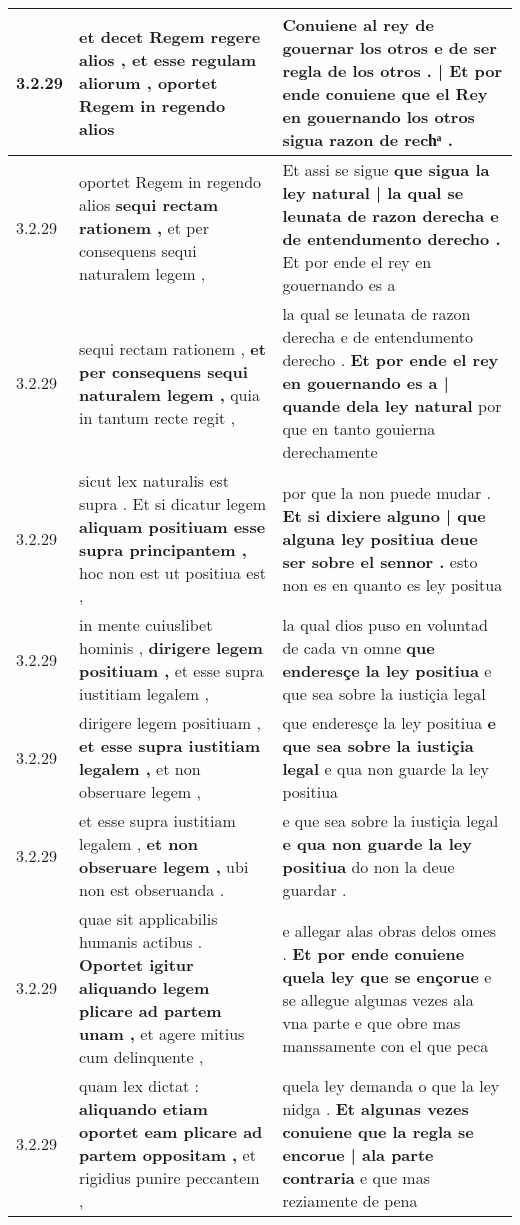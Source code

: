 \begin{tabular}{|p{1cm}|p{6.5cm}|p{6.5cm}|}
3.2.29 & et decet Regem regere alios , \textbf{ et esse regulam aliorum , } oportet Regem in regendo alios & Conuiene al rey de gouernar los otros \textbf{ e de ser regla de los otros . | Et por ende conuiene } que el Rey en gouernando los otros sigua razon de rechͣ . \\\hline
3.2.29 & oportet Regem in regendo alios \textbf{ sequi rectam rationem , } et per consequens sequi naturalem legem , & Et assi se sigue \textbf{ que sigua la ley natural | la qual se leunata de razon derecha e de entendumento derecho . } Et por ende el rey en gouernando es a \\\hline
3.2.29 & sequi rectam rationem , \textbf{ et per consequens sequi naturalem legem , } quia in tantum recte regit , & la qual se leunata de razon derecha e de entendumento derecho . \textbf{ Et por ende el rey en gouernando es a | quande dela ley natural } por que en tanto gouierna derechamente \\\hline
3.2.29 & sicut lex naturalis est supra . Et si dicatur legem \textbf{ aliquam positiuam esse supra principantem , } hoc non est ut positiua est , & por que la non puede mudar . \textbf{ Et si dixiere alguno | que alguna ley positiua deue ser sobre el sennor . } esto non es en quanto es ley positua \\\hline
3.2.29 & in mente cuiuslibet hominis , \textbf{ dirigere legem positiuam , } et esse supra iustitiam legalem , & la qual dios puso en voluntad de cada vn omne \textbf{ que enderesçe la ley positiua } e que sea sobre la iustiçia legal \\\hline
3.2.29 & dirigere legem positiuam , \textbf{ et esse supra iustitiam legalem , } et non obseruare legem , & que enderesçe la ley positiua \textbf{ e que sea sobre la iustiçia legal } e qua non guarde la ley positiua \\\hline
3.2.29 & et esse supra iustitiam legalem , \textbf{ et non obseruare legem , } ubi non est obseruanda . & e que sea sobre la iustiçia legal \textbf{ e qua non guarde la ley positiua } do non la deue guardar . \\\hline
3.2.29 & quae sit applicabilis humanis actibus . \textbf{ Oportet igitur aliquando legem plicare ad partem unam , } et agere mitius cum delinquente , & e allegar alas obras delos omes . \textbf{ Et por ende conuiene quela ley que se ençorue } e se allegue algunas vezes ala vna parte e que obre mas manssamente con el que peca \\\hline
3.2.29 & quam lex dictat : \textbf{ aliquando etiam oportet eam plicare ad partem oppositam , } et rigidius punire peccantem , & quela ley demanda o que la ley nidga . \textbf{ Et algunas vezes conuiene que la regla se encorue | ala parte contraria } e que mas reziamente de pena \\\hline

\end{tabular}

